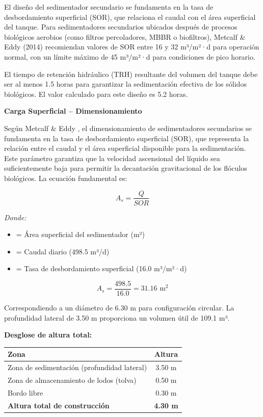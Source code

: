 \documentclass[12pt,a4paper]{article}
\begin{document}
El diseño del sedimentador secundario se fundamenta en la tasa de desbordamiento superficial (SOR), que relaciona el caudal con el área superficial del tanque. Para sedimentadores secundarios ubicados después de procesos biológicos aerobios (como filtros percoladores, MBBR o biofiltros), Metcalf \& Eddy (2014) recomiendan valores de SOR entre 16 y 32 m³/m²·d para operación normal, con un límite máximo de 45 m³/m²·d para condiciones de pico horario.

El tiempo de retención hidráulico (TRH) resultante del volumen del tanque debe ser al menos 1.5 horas para garantizar la sedimentación efectiva de los sólidos biológicos. El valor calculado para este diseño es 5.2 horas.

\textbf{Carga Superficial -- Dimensionamiento}

Según Metcalf \& Eddy \cite{metcalf2014}, el dimensionamiento de sedimentadores secundarios se fundamenta en la tasa de desbordamiento superficial (SOR), que representa la relación entre el caudal y el área superficial disponible para la sedimentación. Este parámetro garantiza que la velocidad ascensional del líquido sea suficientemente baja para permitir la decantación gravitacional de los flóculos biológicos. La ecuación fundamental es:

\begin{equation}
A_s = \frac{Q}{SOR}
\end{equation}

\textit{Donde:}
\begin{itemize}[noitemsep,leftmargin=2em]
    \item[$A_s$] = Área superficial del sedimentador (m²)
    \item[$Q$] = Caudal diario (498.5 m³/d)
    \item[$SOR$] = Tasa de desbordamiento superficial (16.0 m³/m²·d)
\end{itemize}

\begin{equation}
A_s = \frac{498.5}{16.0} = 31.16 \text{ m}^2
\end{equation}

Correspondiendo a un diámetro de 6.30 m para configuración circular. La profundidad lateral de 3.50 m proporciona un volumen útil de 109.1 m³.

\textbf{Desglose de altura total:}

\begin{table}[H]
\centering
\small
\begin{tabular}{lc}
\toprule
Zona & Altura \\
\midrule
Zona de sedimentación (profundidad lateral) & 3.50 m \\
Zona de almacenamiento de lodos (tolva) & 0.50 m \\
Bordo libre & 0.30 m \\
\midrule
\textbf{Altura total de construcción} & \textbf{4.30 m} \\
\bottomrule
\end{tabular}
\end{table}
\end{document}
